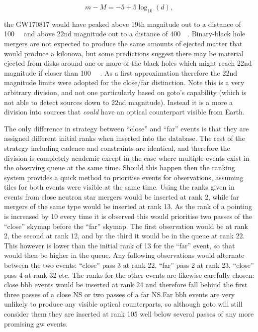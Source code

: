 \begin{colsection}
\begin{colsection}
\begin{equation}
    m-M = -5 +5\log_{10}(d),
    \label{eq:magnitude}
\end{equation}

the GW170817 would have peaked above 19th magnitude out to a distance of \SI{100}{\mega\parsec} and above 22nd magnitude out to a distance of \SI{400}{\mega\parsec}. Binary-black hole mergers are not expected to produce the same amounts of ejected matter that would produce a kilonova, but some predictions suggest there may be material ejected from disks around one or more of the black holes which might reach 22nd magnitude if closer than \SI{100}{\mega\parsec} \citep{BBH_EM, BBH_Gompertz}. As a first approximation therefore the 22nd magnitude limits were adopted for the close/far distinction. Note this is a very arbitrary division, and not one particularly based on \gls{goto}'s capability (which is not able to detect sources down to 22nd magnitude). Instead it is a more a division into sources that \textit{could} have an optical counterpart visible from Earth.

The only difference in strategy between ``close'' and ``far'' events is that they are assigned different initial ranks when inserted into the database. The rest of the strategy including cadence and constraints are identical, and therefore the division is completely academic except in the case where multiple events exist in the observing queue at the same time. Should this happen then the ranking system provides a quick method to prioritise events for observations, assuming tiles for both events were visible at the same time. Using the ranks given in  events from close neutron star mergers would be inserted at rank 2, while far mergers of the same type would be inserted at rank 13. As the rank of a pointing is increased by 10 every time it is observed this would prioritise two passes of the ``close'' skymap before the ``far'' skymap. The first observation would be at rank 2, the second at rank 12, and by the third it would be in the queue at rank 22. This however is lower than the initial rank of 13 for the ``far'' event, so that would then be higher in the queue. Any following observations would alternate between the two events: ``close'' pass 3 at rank 22, ``far'' pass 2 at rank 23, ``close'' pass 4 at rank 32 etc. The ranks for the other events are likewise carefully chosen: close \gls{bbh} events would be inserted at rank 24 and therefore fall behind the first three passes of a close NS or two passes of a far NS.\@ Far \gls{bbh} events are very unlikely to produce any visible optical counterparts, so although \gls{goto} will still consider them they are inserted at rank 105 well below several passes of any more promising \gls{gw} events.


\end{colsection}
\end{colsection}
